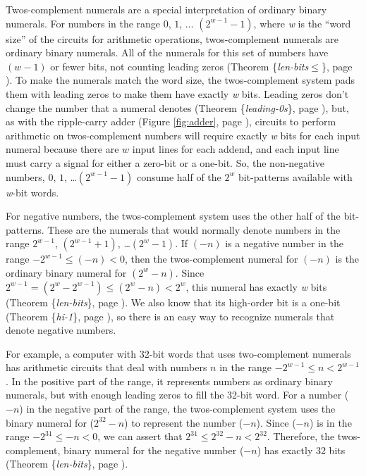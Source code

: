 Twos-complement
numerals are a special interpretation of
ordinary binary numerals.
For numbers in the range $0$, $1$, $\dots$ $(2^{w-1}-1)$,
where \emph{w} is the ``word size''
of the circuits for arithmetic operations,
twos-complement numerals are ordinary binary numerals.
All of the numerals for this set of numbers
have $(w-1)$ or fewer bits,
not counting leading zeros
(Theorem \{\emph{len-bits}$\le$\}, page \pageref{len-bitsLE}).
To make the numerals match the word size,
the twos-complement system pads them with leading zeros
to make them have exactly \emph{w} bits.
Leading zeros don't change the number that a numeral denotes
(Theorem \{\emph{leading-0s}\}, page \pageref{leading-0s}), but,
as with the ripple-carry adder (Figure \ref{fig:adder}, page \pageref{fig:adder}),
circuits to perform arithmetic on twos-complement numbers will
require exactly \emph{w} bits for each input numeral
because there are $w$ input lines for each addend,
and each input line must carry a signal
for either a zero-bit or a one-bit.
So, the non-negative numbers, $0$, $1$, \dots $(2^{w-1}-1)$
consume half of the $2^w$ bit-patterns available with
\emph{w}-bit words.

For negative numbers,
the twos-complement system uses the other half of the bit-patterns.
These are the numerals that would normally denote numbers in the range
$2^{w-1}$, $(2^{w-1}+1)$, \dots $(2^{w}-1)$.
If $(-n)$ is a negative number in the range $-2^{w-1} \leq (-n) < 0$,
\label{2s-def}
then the twos-complement numeral for $(-n)$
is the ordinary binary numeral for $(2^w - n)$.
Since $2^{w-1} = (2^{w}-2^{w-1}) \leq (2^w - n) < 2^w$,
this numeral has exactly \emph{w} bits
(Theorem \{\emph{len-bits}\}, page \pageref{len-bits}).
We also know that its high-order bit is a one-bit
(Theorem \{\emph{hi-1}\}, page \pageref{hi-1}),
so there is an easy way to recognize numerals that denote negative numbers.

For example, a computer with
32-bit words that uses
two-complement numerals has arithmetic circuits that
deal with numbers $n$ in the range $-2^{w-1} \leq n < 2^{w-1}$.
In the positive part of the range, it represents numbers as
ordinary binary numerals, but with enough leading zeros
to fill the 32-bit word.
For a number ($-n$) in the negative part of the range,
the twos-complement system uses the binary numeral
for ($2^{32}-n$) to represent the number ($-n$).
Since ($-n$) is in the range
$-2^{31} \le -n < 0$, we can assert that
$2^{31} \le 2^{32}-n < 2^{32}$.
Therefore, the twos-complement, binary numeral
for the negative number ($-n$)
has exactly 32 bits (Theorem \{\emph{len-bits}\}, page \pageref{len-bits}).

